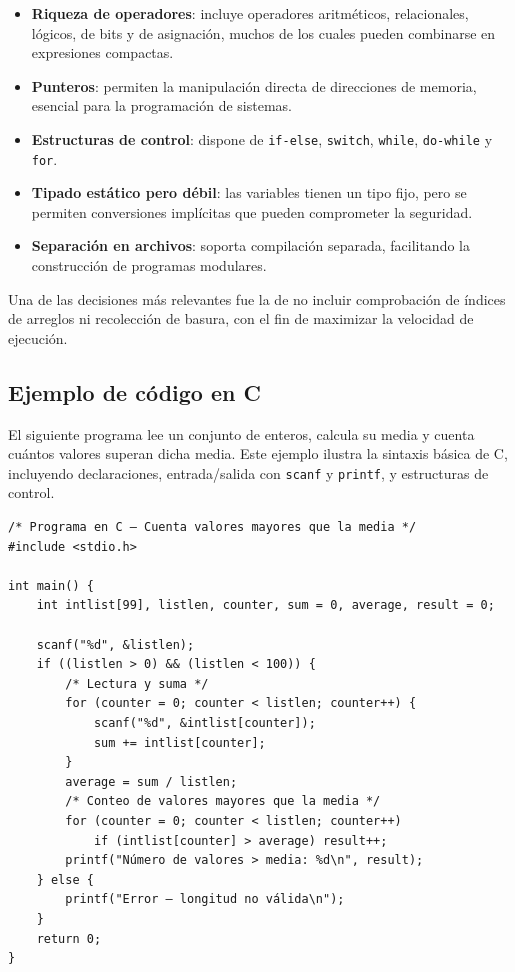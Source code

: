 \begin{itemize}
  \item \textbf{Riqueza de operadores}: incluye operadores aritméticos, relacionales, lógicos, de bits y de asignación, muchos de los cuales pueden combinarse en expresiones compactas.
  \item \textbf{Punteros}: permiten la manipulación directa de direcciones de memoria, esencial para la programación de sistemas.
  \item \textbf{Estructuras de control}: dispone de \texttt{if-else}, \texttt{switch}, \texttt{while}, \texttt{do-while} y \texttt{for}.
  \item \textbf{Tipado estático pero débil}: las variables tienen un tipo fijo, pero se permiten conversiones implícitas que pueden comprometer la seguridad.
  \item \textbf{Separación en archivos}: soporta compilación separada, facilitando la construcción de programas modulares.
\end{itemize}

Una de las decisiones más relevantes fue la de no incluir comprobación de índices de arreglos ni recolección de basura, con el fin de maximizar la velocidad de ejecución.

\subsection{Ejemplo de código en C}

El siguiente programa lee un conjunto de enteros, calcula su media y cuenta cuántos valores superan dicha media. Este ejemplo ilustra la sintaxis básica de C, incluyendo declaraciones, entrada/salida con \texttt{scanf} y \texttt{printf}, y estructuras de control.

\begin{verbatim}
/* Programa en C – Cuenta valores mayores que la media */
#include <stdio.h>

int main() {
    int intlist[99], listlen, counter, sum = 0, average, result = 0;
    
    scanf("%d", &listlen);
    if ((listlen > 0) && (listlen < 100)) {
        /* Lectura y suma */
        for (counter = 0; counter < listlen; counter++) {
            scanf("%d", &intlist[counter]);
            sum += intlist[counter];
        }
        average = sum / listlen;
        /* Conteo de valores mayores que la media */
        for (counter = 0; counter < listlen; counter++)
            if (intlist[counter] > average) result++;
        printf("Número de valores > media: %d\n", result);
    } else {
        printf("Error – longitud no válida\n");
    }
    return 0;
}
\end{verbatim}

